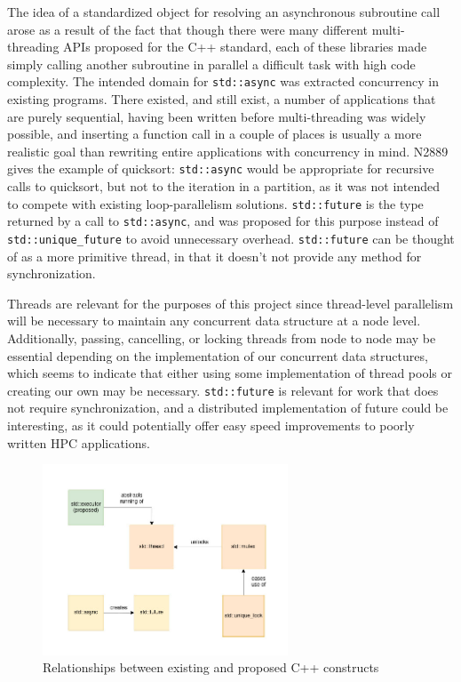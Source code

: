 The idea of a standardized object for resolving an asynchronous subroutine call arose as a result of the fact that though there were many different multi-threading APIs proposed for the C++ standard, each of these libraries made simply calling another subroutine in parallel a difficult task with high code complexity. The intended domain for \texttt{std::async} was extracted concurrency in existing programs. There existed, and still exist, a number of applications that are purely sequential, having been written before multi-threading was widely possible, and inserting a function call in a couple of places is usually a more realistic goal than rewriting entire applications with concurrency in mind. N2889 gives the example of quicksort: \texttt{std::async} would be appropriate for recursive calls to quicksort, but not to the iteration in a partition, as it was not intended to compete with existing loop-parallelism solutions. \texttt{std::future} is the type returned by a call to \texttt{std::async}, and was proposed for this purpose instead of \texttt{std::unique\_future} to avoid unnecessary overhead. \texttt{std::future} can be thought of as a more primitive thread, in that it doesn't not provide any method for synchronization. 

Threads are relevant for the purposes of this project since thread-level parallelism will be necessary to maintain any concurrent data structure at a node level. Additionally, passing, cancelling, or locking threads from node to node may be essential depending on the implementation of our concurrent data structures, which seems to indicate that either using some implementation of thread pools or creating our own may be necessary. \texttt{std::future} is relevant for work that does not require synchronization, and a distributed implementation of future could be interesting, as it could potentially offer easy speed improvements to poorly written HPC applications. 


\begin{figure}[h]
\centering
\includegraphics[width=0.65\textwidth]{Figures/cpp_firstclass.jpg}
\caption{Relationships between existing and proposed C++ constructs}
\label{fig:cpp_firstclass}
\end{figure}

